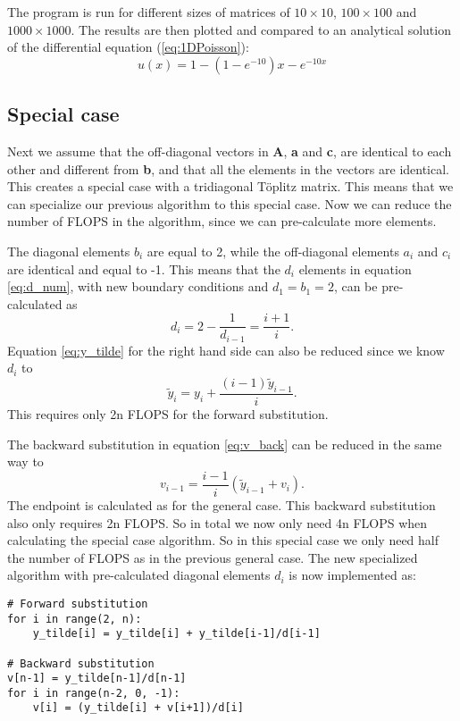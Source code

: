 \documentclass[12pt,a4paper,english]{article}
\begin{document}
The program is run for different sizes of matrices of $10\times 10$, $100\times100$ and $1000\times1000$. The results are then plotted and compared to an analytical solution of the differential equation (\ref{eq:1DPoisson}):
\begin{equation}
\label{eq:analytic}
u(x) = 1-(1-e^{-10})x-e^{-10x}
\end{equation}

\subsection{Special case}
Next we assume that the off-diagonal vectors in \textbf{A}, \textbf{a} and \textbf{c}, are identical to each other and different from \textbf{b}, and that all the elements in the vectors are identical. This creates a special case with a tridiagonal Töplitz matrix. This means that we can specialize our previous algorithm to this special case. Now we can reduce the number of FLOPS in the algorithm, since we can pre-calculate more elements.

The diagonal elements $b_i$ are equal to 2, while the off-diagonal elements $a_i$ and $c_i$ are identical and equal to -1. This means that the $d_i$ elements in equation \ref{eq:d_num}, with new boundary conditions and $d_1=b_1=2$, can be pre-calculated as
\begin{equation}
\label{eq:d_special}
d_i = 2-\frac{1}{d_{i-1}}=\frac{i+1}{i}.
\end{equation}
Equation \ref{eq:y_tilde} for the right hand side can also be reduced since we know $d_i$ to
\begin{equation}
\label{eq:y_special}
\tilde{y}_i = y_i+\frac{(i-1)\tilde{y}_{i-1}}{i}.
\end{equation}
This requires only 2n FLOPS for the forward substitution.

The backward substitution in equation \ref{eq:v_back} can be reduced in the same way to 
\begin{equation}
\label{eq:v_special}
v_{i-1} = \frac{i-1}{i}(\tilde{y}_{i-1}+v_i).
\end{equation}
The endpoint is calculated as for the general case. This backward substitution also only requires 2n FLOPS. So in total we now only need 4n FLOPS when calculating the special case algorithm. So in this special case we only need half the number of FLOPS as in the previous general case. The new specialized algorithm with pre-calculated diagonal elements $d_i$ is now implemented as:
\begin{lstlisting}
# Forward substitution
for i in range(2, n):
	y_tilde[i] = y_tilde[i] + y_tilde[i-1]/d[i-1]

# Backward substitution
v[n-1] = y_tilde[n-1]/d[n-1]
for i in range(n-2, 0, -1):
	v[i] = (y_tilde[i] + v[i+1])/d[i]
\end{lstlisting}
\end{document}
